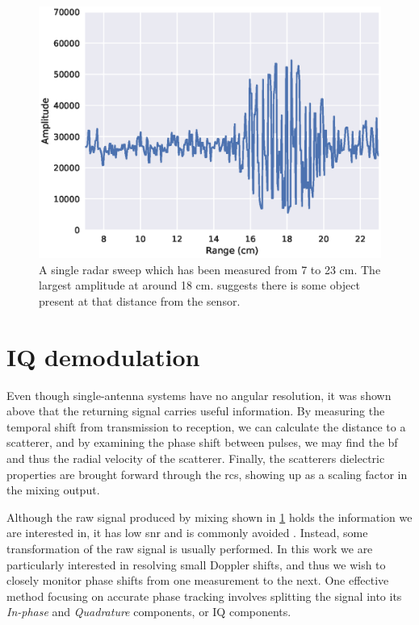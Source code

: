 \begin{figure}[h]
	\centering
	\includegraphics[scale=0.7]{figs_temp/single_sweep_raw}
	\caption{A single radar sweep which has been measured from 7 to 23 cm. The largest amplitude at around 18 cm. suggests there is some object present at that distance from the sensor.}
	\label{fig:single_sweep_raw}
\end{figure}

\section{IQ demodulation}
\label{IQ}

Even though single-antenna systems have no angular resolution, it was shown above that the returning signal carries useful information. By measuring the temporal shift from transmission to reception, we can calculate the distance to a scatterer, and by examining the phase shift between pulses, we may find the \gls{bf} and thus the radial velocity of the scatterer. Finally, the scatterers dielectric properties are brought forward through the \gls{rcs}, showing up as a scaling factor in the mixing output.

Although the raw signal produced by mixing shown in \ref{fig:single_sweep_raw} holds the information we are interested in, it has low \gls{snr} and is commonly avoided \citep{richards_2014}. Instead, some transformation of the raw signal is usually performed. In this work we are particularly interested in resolving small Doppler shifts, and thus we wish to closely monitor phase shifts from one measurement to the next. One effective method focusing on accurate phase tracking involves splitting the signal into its \emph{In-phase} and \emph{Quadrature} components, or IQ components. 

